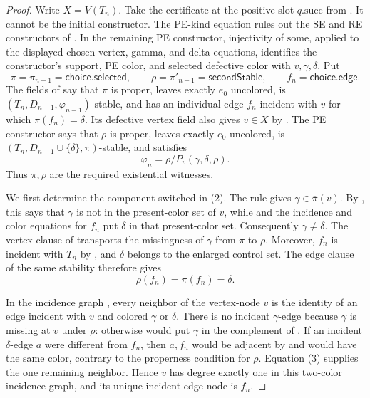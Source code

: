 \begin{proof}
Write \(X=V(T_n)\).  Take the certificate at the positive slot
\(q.\mathrm{succ}\) from .  It cannot be the
initial constructor.  The PE-kind equation rules out the SE and RE
constructors of .  In the remaining PE
constructor, injectivity of \(\mathrm{some}\), applied to the displayed
chosen-vertex, gamma, and delta equations, identifies the constructor's
support, PE color, and selected defective color with
\(v,\gamma,\delta\).  Put
\[
 \pi=\pi_{n-1}=\mathsf{choice.selected},\qquad
 \rho=\pi'_{n-1}=\mathsf{secondStable},\qquad
 f_n=\mathsf{choice.edge}.
\]
The fields of  say that \(\pi\) is
proper, leaves exactly \(e_0\) uncolored, is
\((T_n,D_{n-1},\varphi_{n-1})\)-stable, and has an individual edge
\(f_n\) incident with \(v\) for which \(\pi(f_n)=\delta\).  Its defective
vertex field also gives \(v\in X\) by .  The PE
constructor says that
\(\rho\) is proper, leaves exactly \(e_0\) uncolored, is
\((T_n,D_{n-1}\cup\{\delta\},\pi)\)-stable, and satisfies
\[
 \varphi_n=\rho/P_v(\gamma,\delta,\rho).                         \tag{2}
\]
Thus \(\pi,\rho\) are the required existential witnesses.

We first determine the component switched in (2).  The rule
 gives
\(\gamma\in\overline\pi(v)\).  By , this says
that \(\gamma\) is not in the present-color set of \(v\), while
 and the incidence and color equations for \(f_n\)
put \(\delta\) in that present-color set.  Consequently
\(\gamma\ne\delta\).  The vertex clause of 
transports the missingness of \(\gamma\) from \(\pi\) to \(\rho\).
Moreover, \(f_n\) is incident with \(T_n\) by
, and \(\delta\) belongs to the enlarged
control set.  The edge clause of the same stability therefore gives
\[
 \rho(f_n)=\pi(f_n)=\delta.                                     \tag{3}
\]

In the incidence graph , every neighbor
of the vertex-node \(v\) is the identity of an edge incident with \(v\)
and colored \(\gamma\) or \(\delta\).  There is no incident
\(\gamma\)-edge because \(\gamma\) is missing at \(v\) under \(\rho\):
otherwise  would put \(\gamma\) in the complement
of .  If an incident \(\delta\)-edge \(a\) were
different from \(f_n\), then \(a,f_n\) would be adjacent by
 and would have the same color, contrary to the
properness condition  for \(\rho\).
Equation (3) supplies the one remaining neighbor.  Hence \(v\) has degree
exactly one in this two-color incidence graph, and its unique incident
edge-node is \(f_n\).


\end{proof}
